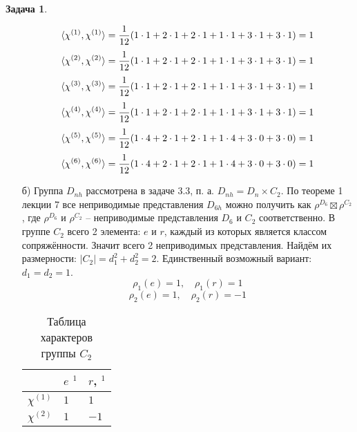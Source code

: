 \documentclass[12pt]{article}
\theoremstyle{definition}
\newtheorem{zad}{Задача}[section]
\begin{document}
\begin{zad}
\begin{itemize}
\begin{equation}
    \braket{\chi^{(1)},\chi^{(1)}}=\frac{1}{12}(1\cdot1+2\cdot1+2\cdot 1+1\cdot 1+3\cdot1+3\cdot1)=1
\end{equation}
\begin{equation}
    \braket{\chi^{(2)},\chi^{(2)}}=\frac{1}{12}(1\cdot1+2\cdot1+2\cdot 1+1\cdot 1+3\cdot1+3\cdot1)=1
\end{equation}
\begin{equation}
    \braket{\chi^{(3)},\chi^{(3)}}=\frac{1}{12}(1\cdot1+2\cdot1+2\cdot 1+1\cdot 1+3\cdot1+3\cdot1)=1
\end{equation}
\begin{equation}
    \braket{\chi^{(4)},\chi^{(4)}}=\frac{1}{12}(1\cdot1+2\cdot1+2\cdot 1+1\cdot 1+3\cdot1+3\cdot1)=1
\end{equation}
\begin{equation}
    \braket{\chi^{(5)},\chi^{(5)}}=\frac{1}{12}(1\cdot4+2\cdot1+2\cdot 1+1\cdot 4+3\cdot0+3\cdot0)=1
\end{equation}
\begin{equation}
    \braket{\chi^{(6)},\chi^{(6)}}=\frac{1}{12}(1\cdot4+2\cdot1+2\cdot 1+1\cdot 4+3\cdot0+3\cdot0)=1
\end{equation}
\item[б)] Группа $D_{nh}$ рассмотрена в задаче 3.3, п. а. $D_{nh}=D_n\times C_2$. По теореме 1 лекции 7 все неприводимые представления $D_{6h}$ можно получить как $\rho^{D_6}\boxtimes\rho^{C_2}$, где $\rho^{D_6}$ и $\rho^{C_2}$ -- неприводимые представления $D_6$ и $C_2$ соответственно. В группе $C_2$ всего 2 элемента: $e$ и $r$, каждый из которых является классом сопряжённости. Значит всего 2 неприводимых представления. Найдём их размерности: $|C_2|=d_1^2+d_2^2=2$. Единственный возможный вариант: $d_1=d_2=1$.
\begin{equation}
    \rho_1(e)=1,\quad\rho_1(r)=1
\end{equation}
\begin{equation}
    \rho_2(e)=1,\quad\rho_2(r)=-1
\end{equation}
\begin{table}[h!]
\centering
\begin{tabular}{|l|l|l|}
\hline
 & $e$ $^1$ & $r$, $^1$ \\ \hline
$\chi^{(1)}$ & $1$ & $1$ \\ \hline
$\chi^{(2)}$ & $1$ & $-1$ \\ \hline
\end{tabular}
\caption{Таблица характеров группы $C_2$}
\end{table}

\end{itemize}
\end{zad}
\end{document}
